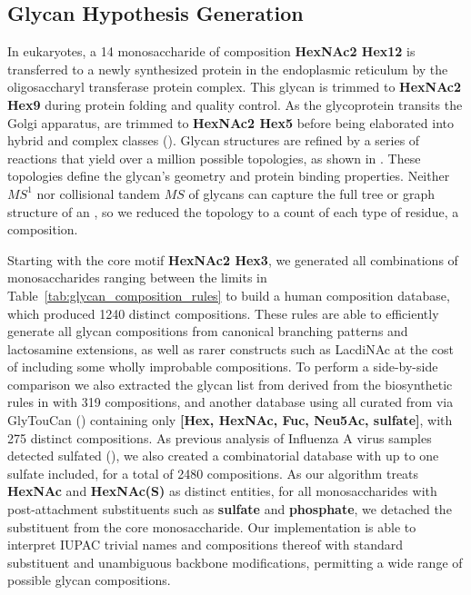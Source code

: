 \subsection{Glycan Hypothesis Generation}

    In eukaryotes, a 14 monosaccharide \nglycan of composition \textbf{HexNAc2 Hex12} is
    transferred to a newly synthesized protein in the endoplasmic reticulum by
    the oligosaccharyl transferase protein complex.  This glycan is trimmed to
    \textbf{HexNAc2 Hex9} during protein folding and quality control.  As the glycoprotein
    transits the Golgi apparatus, \nglycans are trimmed to \textbf{HexNAc2 Hex5} before
    being elaborated into hybrid and complex \nglycan classes (\citealp{Stanley2009}).
    Glycan structures are refined by a series of reactions that yield over a million
    possible \nglycan topologies, as shown in \citealp{Akune2016}. These topologies define
    the glycan's geometry and protein binding properties. Neither $MS^1$ nor collisional
    tandem $MS$ of glycans can capture the full tree or graph structure of an \nglycan,
    so we reduced the topology to a count of each type of residue, a composition.

    Starting with the core motif \textbf{HexNAc2 Hex3}, we generated all combinations of
    monosaccharides ranging between the limits in Table~\ref{tab:glycan_composition_rules}
    to build a human \nglycan composition database, which produced 1240 distinct compositions.
    These rules are able to efficiently generate all glycan compositions from canonical branching
    patterns and lactosamine extensions, as well as rarer constructs such as LacdiNAc \citealp{Goldberg2009}
    at the cost of including some wholly improbable compositions.
    To perform a side-by-side comparison we also extracted the glycan list from \citealp{Yu2013}
    derived from the biosynthetic rules in \citealp{Krambeck2005} with 319 compositions, and
    another database using all curated \nglycans from \glyspace via GlyTouCan (\citealp{Tiemeyer2017})
    containing only \textbf{[Hex, HexNAc, Fuc, Neu5Ac, sulfate]}, with 275 distinct compositions. As
    previous analysis of Influenza A virus samples detected sulfated \nglycans (\citealp{Khatri2016a}),
    we also created a combinatorial database with up to one sulfate included, for a total
    of 2480 compositions. As our algorithm treats \textbf{HexNAc} and \textbf{HexNAc(S)}
    as distinct entities, for all monosaccharides with post-attachment substituents such
    as \textbf{sulfate} and \textbf{phosphate}, we detached the substituent from the core
    monosaccharide. Our implementation is able to interpret IUPAC trivial names and compositions
    thereof with standard substituent and unambiguous backbone modifications, permitting a
    wide range of possible glycan compositions.

